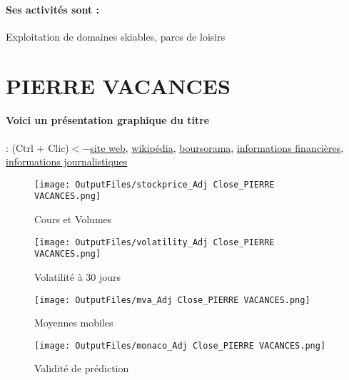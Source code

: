 \documentclass[11pt,a4paper]{report}%
\begin{document}
\paragraph{Ses activités sont : } Exploitation de domaines skiables, parcs de loisirs 
    
    \newpage

\section{PIERRE VACANCES}

\paragraph{Voici un présentation graphique du titre} : (Ctrl + Clic)$<-$\href{http://www.groupepvcp.com/fr}{site web}, \href{https://fr.wikipedia.org/wiki/Groupe_Pierre_%26_Vacances-Center_Parcs}{wikipédia}, \href{https://www.boursorama.com/cours/1rPVAC}{boursorama}, \href{https://www.qwant.com/?q=site:https:%2f%2fwww.easybourse.com%2faction-societe%2fPIERRE-VACANCES&t=web&client=ext-firefox-hp}{informations financières}, \href{https://bourse.lerevenu.com/cours-de-bourse/fiche-valeur-synthese/PIERRE-VACANCES/VAC-FR}{informations journalistiques}
\begin{figure}[!htb]
   \begin{minipage}{0.5\textwidth}
     \centering
     \texttt{[image: OutputFiles/stockprice\_Adj Close\_PIERRE VACANCES.png]}
     \caption{Cours et Volumes}\label{Fig:price_PIERRE VACANCES}
   \end{minipage}\hfill
   \begin{minipage}{0.5\textwidth}
     \centering
     \texttt{[image: OutputFiles/volatility\_Adj Close\_PIERRE VACANCES.png]}
     \caption{Volatilité à 30 jours}\label{Fig:volat_PIERRE VACANCES}
   \end{minipage}
\end{figure}
\begin{figure}[!htb]
   \begin{minipage}{0.5\textwidth}
     \centering
     \texttt{[image: OutputFiles/mva\_Adj Close\_PIERRE VACANCES.png]}
     \caption{Moyennes mobiles}\label{Fig:mva_PIERRE VACANCES}
   \end{minipage}\hfill
   \begin{minipage}{0.5\textwidth}
     \centering
     \texttt{[image: OutputFiles/monaco\_Adj Close\_PIERRE VACANCES.png]}
     \caption{Validité de prédiction}\label{Fig:prediction_PIERRE VACANCES}
   \end{minipage}
\end{figure}
\end{document}
